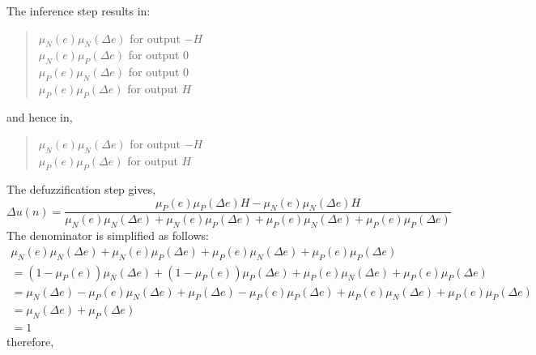 The inference step results in:
\begin{quote}
$\mu_N(e) \mu_N (\Delta e)$ for output $-H$\\
$\mu_N(e) \mu_P (\Delta e)$ for output 0\\
$\mu_P(e) \mu_N (\Delta e)$ for output 0\\
$\mu_P(e) \mu_P (\Delta e)$ for output $H$
\end{quote}
and hence in,
\begin{quote}
$\mu_N(e) \mu_N (\Delta e)$ for output $-H$\\
$\mu_P(e) \mu_P (\Delta e)$ for output $H$
\end{quote}
The defuzzification step gives,
\begin{equation}
    \Delta u(n)=\frac{\mu_P(e) \mu_P (\Delta e)H-\mu_N(e) \mu_N (\Delta e)H}{\mu_N(e) \mu_N (\Delta e)+\mu_N(e) \mu_P (\Delta e)+\mu_P(e) \mu_N (\Delta e)+\mu_P(e) \mu_P (\Delta e)}
\end{equation}
The denominator is simplified as follows:
\begin{equation}
\begin{split}
    \mu_N(e) \mu_N (\Delta e)+\mu_N(e) \mu_P (\Delta e)+\mu_P(e) \mu_N (\Delta e)+\mu_P(e) \mu_P (\Delta e)\\
    =(1-\mu_P(e)) \mu_N (\Delta e)+(1-\mu_P(e)) \mu_P (\Delta e)+\mu_P(e) \mu_N (\Delta e)+\mu_P(e) \mu_P (\Delta e)\\
    =\mu_N (\Delta e)-\mu_P(e)\mu_N (\Delta e)+\mu_P (\Delta e)-\mu_P(e) \mu_P (\Delta e)+\mu_P(e) \mu_N (\Delta e)+\mu_P(e) \mu_P (\Delta e)\\
    =\mu_N (\Delta e)+\mu_P (\Delta e)\\
    =1
\end{split}
\end{equation}
therefore,
